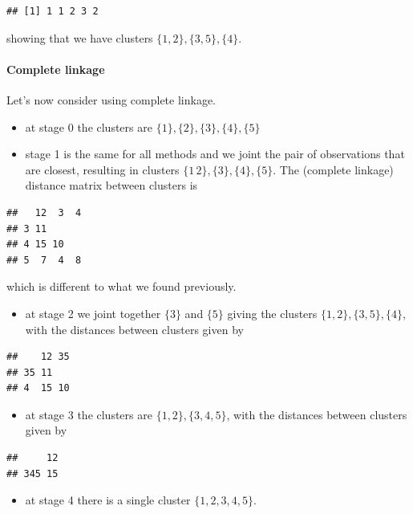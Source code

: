 \documentclass[
]{book}
\providecommand{\tightlist}{%
  \setlength{\itemsep}{0pt}\setlength{\parskip}{0pt}}
\theoremstyle{definition}
\theoremstyle{definition}
\theoremstyle{definition}
\theoremstyle{definition}
\theoremstyle{remark}
\begin{document}
\begin{verbatim}
## [1] 1 1 2 3 2
\end{verbatim}

showing that we have clusters \(\{1,2\}, \{3,5\}, \{4\}\).

\paragraph*{Complete linkage}\label{complete-linkage}

Let's now consider using complete linkage.

\begin{itemize}
\item
  at stage 0 the clusters are \(\{1\}, \{2\},\{3\},\{4\},\{5\}\)
\item
  stage 1 is the same for all methods and we joint the pair of observations that are closest, resulting in clusters \(\{1\, 2\},\{3\},\{4\},\{5\}\). The (complete linkage) distance matrix between clusters is
\end{itemize}

\begin{verbatim}
##   12  3  4
## 3 11      
## 4 15 10   
## 5  7  4  8
\end{verbatim}

which is different to what we found previously.

\begin{itemize}
\tightlist
\item
  at stage 2 we joint together \(\{3\}\) and \(\{5\}\) giving the clusters \(\{1, 2\},\{3, 5\},\{4\}\), with the distances between clusters given by
\end{itemize}

\begin{verbatim}
##    12 35
## 35 11   
## 4  15 10
\end{verbatim}

\begin{itemize}
\tightlist
\item
  at stage 3 the clusters are \(\{1, 2\},\{3, 4, 5\}\), with the distances between clusters given by
\end{itemize}

\begin{verbatim}
##     12
## 345 15
\end{verbatim}

\begin{itemize}
\tightlist
\item
  at stage 4 there is a single cluster \(\{1, 2, 3, 4, 5\}\).
\end{itemize}
\end{document}
